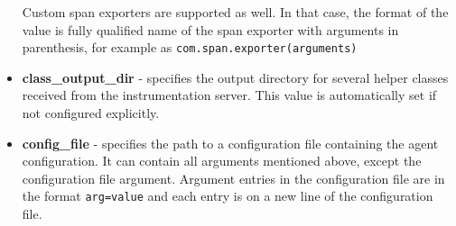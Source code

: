 \begin{itemize}
	Custom span exporters are supported as well. In that case, the format of the value is fully qualified name of the span exporter with arguments in parenthesis, for example as \texttt{com.span.exporter(arguments)}
	\item \textbf{class\_output\_dir} - specifies the output directory for several helper classes received from the instrumentation server. This value is automatically set if not configured explicitly.
	\item \textbf{config\_file} - specifies the path to a configuration file containing the agent configuration. It can contain all arguments mentioned above, except the configuration file argument. Argument entries in the configuration file are in the format \texttt{arg=value} and each entry is on a new line of the configuration file. 
\end{itemize}